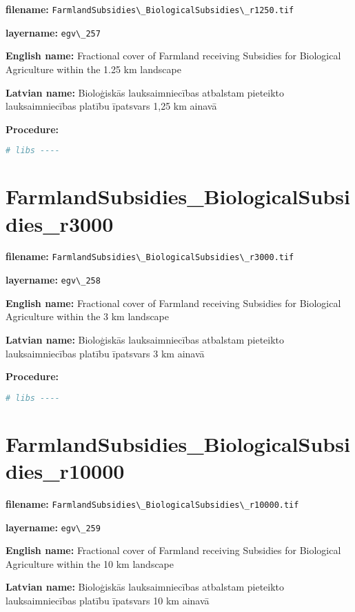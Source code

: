 \documentclass[
]{book}
\newcommand{\passthrough}[1]{#1}
\begin{document}
\textbf{filename:} \passthrough{\lstinline!FarmlandSubsidies\_BiologicalSubsidies\_r1250.tif!}

\textbf{layername:} \passthrough{\lstinline!egv\_257!}

\textbf{English name:} Fractional cover of Farmland receiving Subsidies for Biological Agriculture within the 1.25 km landscape

\textbf{Latvian name:} Bioloģiskās lauksaimniecības atbalstam pieteikto lauksaimniecības platību īpatsvars 1,25 km ainavā

\textbf{Procedure:}

\begin{lstlisting}[language=R]
# libs ----
\end{lstlisting}

\section{FarmlandSubsidies\_BiologicalSubsidies\_r3000}\label{ch06.258}

\textbf{filename:} \passthrough{\lstinline!FarmlandSubsidies\_BiologicalSubsidies\_r3000.tif!}

\textbf{layername:} \passthrough{\lstinline!egv\_258!}

\textbf{English name:} Fractional cover of Farmland receiving Subsidies for Biological Agriculture within the 3 km landscape

\textbf{Latvian name:} Bioloģiskās lauksaimniecības atbalstam pieteikto lauksaimniecības platību īpatsvars 3 km ainavā

\textbf{Procedure:}

\begin{lstlisting}[language=R]
# libs ----
\end{lstlisting}

\section{FarmlandSubsidies\_BiologicalSubsidies\_r10000}\label{ch06.259}

\textbf{filename:} \passthrough{\lstinline!FarmlandSubsidies\_BiologicalSubsidies\_r10000.tif!}

\textbf{layername:} \passthrough{\lstinline!egv\_259!}

\textbf{English name:} Fractional cover of Farmland receiving Subsidies for Biological Agriculture within the 10 km landscape

\textbf{Latvian name:} Bioloģiskās lauksaimniecības atbalstam pieteikto lauksaimniecības platību īpatsvars 10 km ainavā
\end{document}
